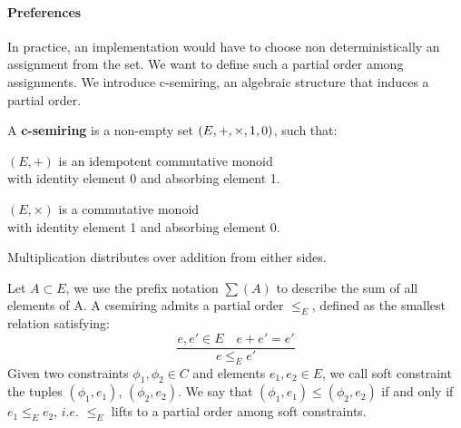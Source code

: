 
\paragraph{Preferences} 
In practice, an implementation would have to choose non deterministically an assignment from the set. We want to define such a partial order among assignments. We introduce c-semiring, an algebraic structure that induces a partial order.


\begin{definition} A \textbf{c-semiring} is a non-empty set $(E, +, \times, \boldmath{1},\boldmath{0} )$, such that:
	\begin{list}{-}{ }
		\item $(E,+)$ is an idempotent commutative monoid \\ 
			\text{ \quad \quad \quad \quad \quad} with identity element 0 and absorbing element 1. 
		\item $(E,\times)$ is a commutative monoid \\
			\text{ \quad \quad \quad \quad \quad} with identity element 1 and absorbing element 0.
		\item Multiplication distributes over addition from either sides.
	\end{list} 
\end{definition}
Let $A \subset E$, we use the prefix notation $\sum(A)$ to describe the sum of all elements of A.
A csemiring admits a partial order $\leq_{E}$, defined as the smallest relation satisfying:
$$ \frac{e,e' \in E \quad e+e' = e'}{e \leq_{E} e'} $$
Given two constraints $\phi_1,\phi_2 \in C$ and elements $e_1,e_2 \in E$, we call soft constraint the tuples $(\phi_1,e_1)$, $(\phi_2,e_2)$. We say that $(\phi_1,e_1)\leq(\phi_2,e_2)$ if and only if $e_1 \leq_E e_2$, $i.e.$ $\leq_E$ lifts to a partial order among soft constraints. 


